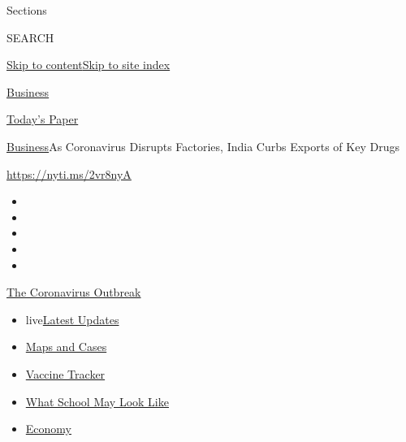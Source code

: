 Sections

SEARCH

\protect\hyperlink{site-content}{Skip to
content}\protect\hyperlink{site-index}{Skip to site index}

\href{https://www.nytimes.com/section/business}{Business}

\href{https://myaccount.nytimes.com/auth/login?response_type=cookie\&client_id=vi}{}

\href{https://www.nytimes.com/section/todayspaper}{Today's Paper}

\href{/section/business}{Business}\textbar{}As Coronavirus Disrupts
Factories, India Curbs Exports of Key Drugs

\url{https://nyti.ms/2vr8nyA}

\begin{itemize}
\item
\item
\item
\item
\item
\end{itemize}

\href{https://www.nytimes.com/news-event/coronavirus?action=click\&pgtype=Article\&state=default\&region=TOP_BANNER\&context=storylines_menu}{The
Coronavirus Outbreak}

\begin{itemize}
\tightlist
\item
  live\href{https://www.nytimes.com/2020/08/02/world/coronavirus-updates.html?action=click\&pgtype=Article\&state=default\&region=TOP_BANNER\&context=storylines_menu}{Latest
  Updates}
\item
  \href{https://www.nytimes.com/interactive/2020/us/coronavirus-us-cases.html?action=click\&pgtype=Article\&state=default\&region=TOP_BANNER\&context=storylines_menu}{Maps
  and Cases}
\item
  \href{https://www.nytimes.com/interactive/2020/science/coronavirus-vaccine-tracker.html?action=click\&pgtype=Article\&state=default\&region=TOP_BANNER\&context=storylines_menu}{Vaccine
  Tracker}
\item
  \href{https://www.nytimes.com/interactive/2020/07/29/us/schools-reopening-coronavirus.html?action=click\&pgtype=Article\&state=default\&region=TOP_BANNER\&context=storylines_menu}{What
  School May Look Like}
\item
  \href{https://www.nytimes.com/live/2020/07/31/business/stock-market-today-coronavirus?action=click\&pgtype=Article\&state=default\&region=TOP_BANNER\&context=storylines_menu}{Economy}
\end{itemize}

